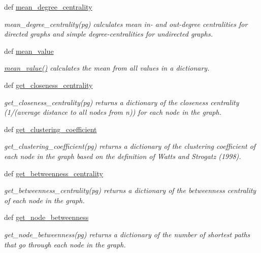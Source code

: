 \begin{CompactItemize}
def \hyperlink{namespacePyPedal_1_1pyp__network_563bee26515afbda191df8558489964d}{mean\_\-degree\_\-centrality}
\begin{CompactList}\small\item\em mean\_\-degree\_\-centrality(pg) calculates mean in- and out-degree centralities for directed graphs and simple degree-centralities for undirected graphs. \item\end{CompactList}\item 
def \hyperlink{namespacePyPedal_1_1pyp__network_f67aecda93c61a5b116b0025670ac3be}{mean\_\-value}
\begin{CompactList}\small\item\em \hyperlink{namespacePyPedal_1_1pyp__network_f67aecda93c61a5b116b0025670ac3be}{mean\_\-value()} calculates the mean from all values in a dictionary. \item\end{CompactList}\item 
def \hyperlink{namespacePyPedal_1_1pyp__network_12847e12c06671b75f871dbae171097a}{get\_\-closeness\_\-centrality}
\begin{CompactList}\small\item\em get\_\-closeness\_\-centrality(pg) returns a dictionary of the closeness centrality (1/(average distance to all nodes from n)) for each node in the graph. \item\end{CompactList}\item 
def \hyperlink{namespacePyPedal_1_1pyp__network_0932c10c8b90d448400e609753602e3c}{get\_\-clustering\_\-coefficient}
\begin{CompactList}\small\item\em get\_\-clustering\_\-coefficient(pg) returns a dictionary of the clustering coefficient of each node in the graph based on the definition of Watts and Strogatz (1998). \item\end{CompactList}\item 
def \hyperlink{namespacePyPedal_1_1pyp__network_802474b23ab95d5ef2421d61f2262b12}{get\_\-betweenness\_\-centrality}
\begin{CompactList}\small\item\em get\_\-betweenness\_\-centrality(pg) returns a dictionary of the betweenness centrality of each node in the graph. \item\end{CompactList}\item 
def \hyperlink{namespacePyPedal_1_1pyp__network_5e1ef79a65c97a5554050f4941b99c22}{get\_\-node\_\-betweenness}
\begin{CompactList}\small\item\em get\_\-node\_\-betweenness(pg) returns a dictionary of the number of shortest paths that go through each node in the graph. \item\end{CompactList}\end{CompactItemize}



